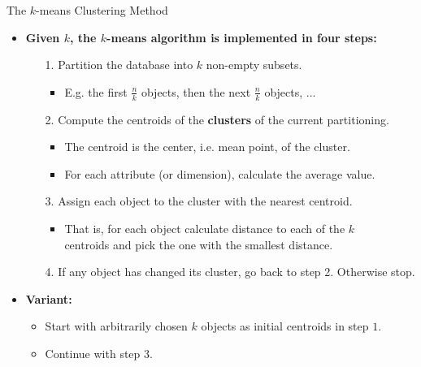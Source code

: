 \begin{frame}{The $k$-means Clustering Method}
	\begin{itemize}
		\item \textbf{Given $k$, the $k$-means algorithm is implemented in four 
		steps:}
		\begin{itemize}
			\item[1.] Partition the database into $k$ non-empty subsets.
			\begin{itemize}
				\item E.g. the first $\frac{n}{k}$ objects, then the next 
				$\frac{n}{k}$ objects, $\ldots$
			\end{itemize}
			\item[2.] Compute the centroids of the \textbf{clusters} of the 
			current partitioning.
			\begin{itemize}
				\item The centroid is the center, i.e. mean point, of the 
				cluster.
				\item For each attribute (or dimension), calculate the average 
				value.
			\end{itemize}
			\item[3.] Assign each object to the cluster with the nearest 
			centroid.
			\begin{itemize}
				\item That is, for each object calculate distance to each of 
				the $k$\\
				centroids and pick the one with the smallest distance.
			\end{itemize}
			\item[4.] If any object has changed its cluster, go back to step 2. 
			Otherwise stop.
		\end{itemize}
		\item \textbf{Variant:}
		\begin{itemize}
			\item Start with arbitrarily chosen $k$ objects as initial 
			centroids in step $1$.
			\item Continue with step $3$.
		\end{itemize}
	\end{itemize}
\end{frame}

